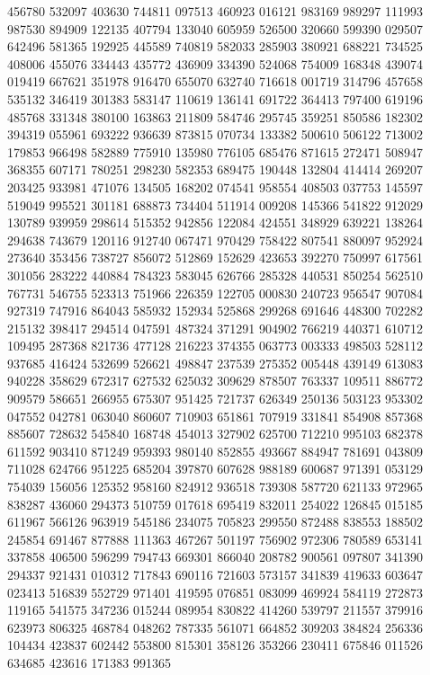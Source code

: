 {456780 532097 403630 744811 097513 460923 016121 983169 989297 111993 987530%
894909 122135 407794 133040 605959 526500 320660 599390 029507 642496 581365%
192925 445589 740819 582033 285903 380921 688221 734525 408006 455076 334443%
435772 436909 334390 524068 754009 168348 439074 019419 667621 351978 916470%
655070 632740 716618 001719 314796 457658 535132 346419 301383 583147 110619%
136141 691722 364413 797400 619196 485768 331348 380100 163863 211809 584746%
295745 359251 850586 182302 394319 055961 693222 936639 873815 070734 133382%
500610 506122 713002 179853 966498 582889 775910 135980 776105 685476 871615%
272471 508947 368355 607171 780251 298230 582353 689475 190448 132804 414414%
269207 203425 933981 471076 134505 168202 074541 958554 408503 037753 145597%
519049 995521 301181 688873 734404 511914 009208 145366 541822 912029 130789%
939959 298614 515352 942856 122084 424551 348929 639221 138264 294638 743679%
120116 912740 067471 970429 758422 807541 880097 952924 273640 353456 738727%
856072 512869 152629 423653 392270 750997 617561 301056 283222 440884 784323%
583045 626766 285328 440531 850254 562510 767731 546755 523313 751966 226359%
122705 000830 240723 956547 907084 927319 747916 864043 585932 152934 525868%
299268 691646 448300 702282 215132 398417 294514 047591 487324 371291 904902%
766219 440371 610712 109495 287368 821736 477128 216223 374355 063773 003333%
498503 528112 937685 416424 532699 526621 498847 237539 275352 005448 439149%
613083 940228 358629 672317 627532 625032 309629 878507 763337 109511 886772%
909579 586651 266955 675307 951425 721737 626349 250136 503123 953302 047552%
042781 063040 860607 710903 651861 707919 331841 854908 857368 885607 728632%
545840 168748 454013 327902 625700 712210 995103 682378 611592 903410 871249%
959393 980140 852855 493667 884947 781691 043809 711028 624766 951225 685204%
397870 607628 988189 600687 971391 053129 754039 156056 125352 958160 824912%
936518 739308 587720 621133 972965 838287 436060 294373 510759 017618 695419%
832011 254022 126845 015185 611967 566126 963919 545186 234075 705823 299550%
872488 838553 188502 245854 691467 877888 111363 467267 501197 756902 972306%
780589 653141 337858 406500 596299 794743 669301 866040 208782 900561 097807%
341390 294337 921431 010312 717843 690116 721603 573157 341839 419633 603647%
023413 516839 552729 971401 419595 076851 083099 469924 584119 272873 119165%
541575 347236 015244 089954 830822 414260 539797 211557 379916 623973 806325%
468784 048262 787335 561071 664852 309203 384824 256336 104434 423837 602442%
553800 815301 358126 353266 230411 675846 011526 634685 423616 171383 991365%
}
